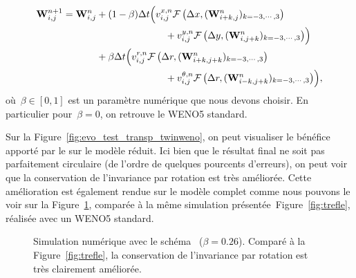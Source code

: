 \documentclass[main.tex]{subfiles}
\begin{document}
\begin{equation}\label{eq:twin-WENO5}
  \begin{split}
\W^{n+1}_{i,j} =\W^n_{i,j} &+ (1-\beta)\Delta t \Bigl(v_{i,j}^{x,n}
\mathcal{F}\left(\Delta x,(\W^n_{i+k,j})_{k=-3,\cdots, 3}\right) \\
&\hspace{25mm} + v_{i,j}^{y,n} \mathcal{F}\left(\Delta y,(\W^n_{i,j+k})_{k=-3,\cdots,3}\right)\Bigr)\\
&+\beta\Delta t \Bigl(v_{i,j}^{r,n}
\mathcal{F}\left(\Delta r,(\W^n_{i+k,j+k})_{k=-3,\cdots, 3}\right) \\
& \hspace{25mm} + v_{i,j}^{\theta,n} \mathcal{F}\left(\Delta r,(\W^n_{i-k,j+k})_{k=-3,\cdots, 3}\right)\Bigr),
  \end{split}
\end{equation}
où~$\beta\in[0,1]$ est un paramètre numérique que nous devons choisir. 
En particulier pour~$\beta=0$, on retrouve le WENO5 standard. 


Sur la Figure~\ref{fig:evo_test_transp_twinweno}, on peut visualiser le bénéfice apporté par le \twinweno sur le modèle réduit. Ici bien que le résultat final ne soit pas parfaitement circulaire (de l'ordre de quelques pourcents d'erreurs), on peut voir que la conservation de l'invariance par rotation est très améliorée. Cette amélioration est également rendue sur le modèle complet comme nous pouvons le voir sur la Figure~\ref{fig:compWENO5}, comparée à la même simulation présentée~Figure~\ref{fig:trefle}, réalisée avec un WENO5 standard.

\begin{figure}[!htb]
\centering
{}
\caption{Simulation numérique avec le schéma \twinweno\  ($\beta=0.26$).  
Comparé à la Figure~\ref{fig:trefle}, la conservation de l'invariance par rotation est très clairement améliorée. 
}\label{fig:compWENO5}
\end{figure}

\end{document}
